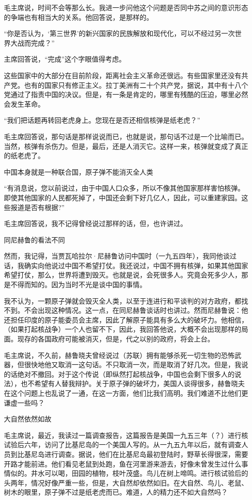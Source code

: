 毛主席说，时间不会等那么长。我进一步问他这个问题是否同中苏之间的意识形态的争端也有相当大的关系。他回答说，是那样的。

“你是否认为，‘第三世界’的新兴国家的民族解放和现代化，可以不经过另一次世界大战而完成？”

主席回答说，“完成”这个字眼值得考虑。

这些国家中的大部分在目前阶段，距离社会主义革命还很远。有些国家里还没有共产党。也有的国家只有修正主义。拉丁美洲有二十个共产党，据说，其中有十八个党通过了指责中国的决议。但是，有一条是肯定的，哪里有残酷的压迫，哪里必然会发生革命。

“我们把话题再转回老虎身上。您现在是否还相信核弹是纸老虎？”

毛主席回答说，那句话是那样说说而已，也就是说，那句话不过是一个比喻而已。当然，核弹有杀伤力。但是，最后，还是人消灭它。这样一来，核弹就变成了真正的纸老虎了。

中国本身就是一种联合国，原子弹不能消灭全人类

“有消息说，您以前说过，由于中国人口众多，所以不像其他国家那样害怕核弹。即使其他国家的人民都死掉了，中国还会剩下好几亿人，因此，可以重建家园。这些报道是否有根据?”

毛主席回答说，我不记得曾经说过那样的话，但，也许讲过。

同尼赫鲁的看法不同

然而，我记得，当贾瓦哈拉尔·尼赫鲁访问中国时（一九五四年），我同他谈过话，我确实向他说过中国不希望打仗。我还说过，中国不拥有核弹，如果其他国家希望打仗，那么，世界将遭到毁灭。也就是说，会死很多人。究竟会死多少人，那是不得而知的。因为当时不光是谈中国的事情。

我不认为，一颗原子弹就会毁灭全人类，以至于连进行和平谈判的对方政府，都找不到。不会出现这种情况。这一点，在同尼赫鲁谈话时也讲过。然而尼赫鲁说：他还担任印度的原子能委员会主席，因此了解原子能具有多么大的破坏力。他相信，（如果打起核战争）一个人也留不下，因此，我回答他说，大概不会出现那样的局面。现存的各国政府可能被消灭，但是，代之以别的政府，将会上台。

毛主席说，不久前，赫鲁晓夫曾经说过（苏联）拥有能够杀死一切生物的恐怖武器，但很快地他又取消一这句话。不只取消一次，而是取消了好几次。但是，我说的话绝对不撤回。对于这个传说（即纵然打起核战争，中国也会剩下很多人的说法），也不希望有人替我辩护。关于原子弹的破坏力，美国人谈得很多，赫鲁晓夫在这个问题上也乱说了一通，在这一方面，他们比我们高明。我们难道不比他们更谦虚一些吗？

大自然依然如故

毛主席说，最近，我读过一篇调查报告，这篇报告是美国一九五三年（？）进行核试验后六年，访问了比基尼岛的一个美国人写的。从一九五九年以后，就有调查人员到比基尼岛进行调查。据说，他们在比基尼岛最初登陆时，野草长得很深，需要开路才能前进。他们看见老鼠到处跑，鱼在河里游来游去，好像未曾发生过什么事情似的。井水可以喝，田园的植物，枝叶茂盛。鸟儿在树上啼鸣。进行核试验后的头两年，情况好像严重一些，但是，大自然却依然如旧。在大自然、鸟儿、老鼠、树木的眼里，原子弹不过是纸老虎而已。难道，人的精力还不如大自然吗？

